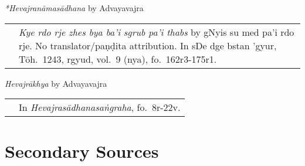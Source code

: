 \documentclass[12pt,twoside]{article}
\begin{document}
\noindent\emph{*Hevajranāmasādhana} by Advayavajra
\noindent\begin{longtable}{ p{} p{} }
	& \emph{Kye rdo rje zhes bya ba'i sgrub pa'i thabs} by gNyis su med pa'i rdo rje. No translator/paṇḍita attribution.  In sDe dge bstan 'gyur, Tōh.\ 1243, rgyud, vol.\ 9 (nya), fo.\ 162r3-175r1. 
\end{longtable}

\noindent\emph{Hevajrākhya} by Advayavajra
\noindent\begin{longtable}{ p{} p{} }
	& In \emph{Hevajrasādhanasaṅgraha}, fo.\ 8r-22v.
\end{longtable}

	\section*{Secondary Sources}
	\printbibliography[notcategory=fullcited,resetnumbers,heading=none]
\end{document}
